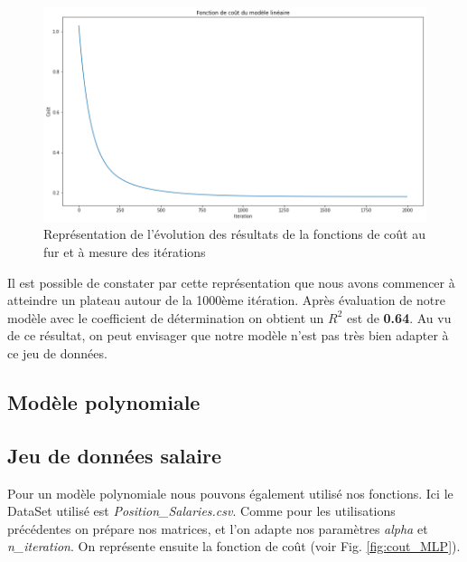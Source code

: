 \documentclass[french]{article}
\begin{document}
\begin{figure}[!htbp]
    \centering
    \includegraphics[width=\textwidth]{Rapport/images/cout_MLM.png}
    \caption{Représentation de l'évolution des résultats de la fonctions de coût au fur et à mesure des itérations}
    \label{fig:cout_MLM}
\end{figure}

\noindent Il est possible de constater par cette représentation que nous avons commencer à atteindre un plateau autour de la 1000ème itération. Après évaluation de notre modèle avec le coefficient de détermination on obtient un $R^{2}$ est de \textbf{0.64}. Au vu de ce résultat, on peut envisager que notre modèle n'est pas très bien adapter à ce jeu de données.

\subsection{Modèle polynomiale}

\subsection{Jeu de données salaire}

Pour un modèle polynomiale nous pouvons également utilisé nos fonctions. Ici le DataSet utilisé est \textit{Position\_Salaries.csv}. Comme pour les utilisations précédentes on prépare nos matrices, et l'on adapte nos paramètres \textit{alpha} et \textit{n\_iteration}. On représente ensuite la fonction de coût (voir Fig. \ref{fig:cout_MLP}).\\
\end{document}
